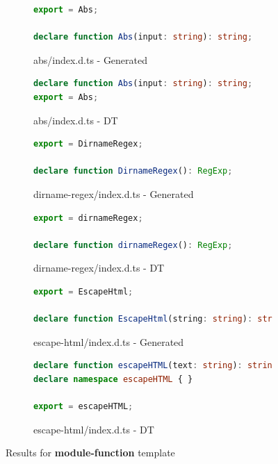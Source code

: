 \documentclass[sigplan,screen]{acmart}
\begin{document}
\begin{figure}[tp]
  \centering
  \begin{subfigure}[t]{0.48\linewidth}
    \begin{lstlisting}[language=TypeScript,numbers=none]
export = Abs;

declare function Abs(input: string): string;
    \end{lstlisting}
    \caption{abs/index.d.ts - Generated}
  \end{subfigure}
  \hfill
  \begin{subfigure}[t]{0.48\linewidth}
    \begin{lstlisting}[language=TypeScript,numbers=none]
declare function Abs(input: string): string;
export = Abs;
    \end{lstlisting}
    \caption{abs/index.d.ts - DT}
  \end{subfigure}


  \begin{subfigure}[t]{0.48\linewidth}
      \begin{lstlisting}[language=TypeScript,numbers=none]
export = DirnameRegex;

declare function DirnameRegex(): RegExp;
      \end{lstlisting}
      \caption{dirname-regex/index.d.ts - Generated}
    \end{subfigure}
    \hfill
    \begin{subfigure}[t]{0.48\linewidth}
      \begin{lstlisting}[language=TypeScript,numbers=none]
export = dirnameRegex;

declare function dirnameRegex(): RegExp;
      \end{lstlisting}
      \caption{dirname-regex/index.d.ts - DT}
    \end{subfigure}


    \begin{subfigure}[t]{0.48\linewidth}
      \begin{lstlisting}[language=TypeScript,numbers=none]
export = EscapeHtml;

declare function EscapeHtml(string: string): string;

      \end{lstlisting}
      \caption{escape-html/index.d.ts - Generated}
    \end{subfigure}
    \hfill
    \begin{subfigure}[t]{0.48\linewidth}
      \begin{lstlisting}[language=TypeScript,numbers=none]
declare function escapeHTML(text: string): string;
declare namespace escapeHTML { }

export = escapeHTML;
      \end{lstlisting}
      \caption{escape-html/index.d.ts - DT}
    \end{subfigure}

  \caption{Results for \textbf{module-function} template}
  \label{fig:experiments-results-module-function}
\end{figure}
\end{document}
